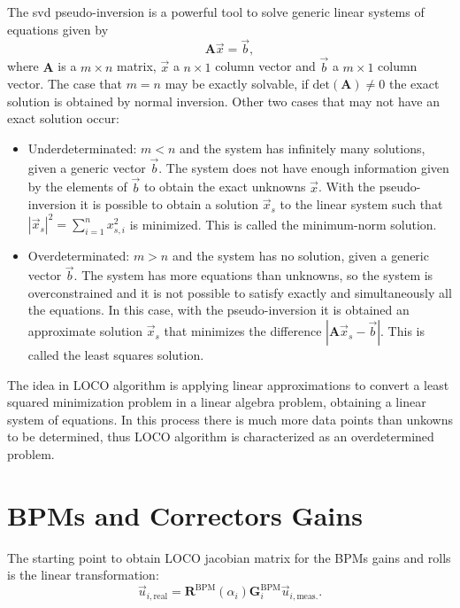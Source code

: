 The \gls{svd} pseudo-inversion is a powerful tool to solve generic linear systems of equations given by
\begin{equation}
    \mathbf{A} \vec{x} = \vec{b},
    \label{eq:linear_system}
\end{equation}
where $\mathbf{A}$ is a $m \times n$ matrix, $\vec{x}$ a $n \times 1$ column vector and $\vec{b}$ a $m \times 1$ column vector. The case that $m=n$ may be exactly solvable, if $\mathrm{det}\left(\mathbf{A}\right) \neq 0$ the exact solution is obtained by normal inversion. Other two cases that may not have an exact solution occur:
\begin{itemize}
    \item Underdeterminated: $m < n$ and the system has infinitely many solutions, given a generic vector $\vec{b}$. The system does not have enough information given by the elements of $\vec{b}$ to obtain the exact unknowns $\vec{x}$. With the pseudo-inversion it is possible to obtain a solution $\vec{x}_s$ to the linear system such that $|\vec{x}_s|^2 = \sum_{i=1}^{n}x^2_{s, i}$ is minimized. This is called the minimum-norm solution.
    \item Overdeterminated: $m > n$ and the system has no solution, given a generic vector $\vec{b}$. The system has more equations than unknowns, so the system is overconstrained and it is not possible to satisfy exactly and simultaneously all the equations. In this case, with the pseudo-inversion it is obtained an approximate solution $\vec{x}_s$ that minimizes the difference $|\mathbf{A}\vec{x}_s - \vec{b}|$. This is called the least squares solution.
\end{itemize}

The idea in LOCO algorithm is applying linear approximations to convert a least squared minimization problem in a linear algebra problem, obtaining a linear system of equations. In this process there is much more data points than unkowns to be determined, thus LOCO algorithm is characterized as an overdetermined problem.

\chapter{BPMs and Correctors Gains}\label{appendix:gains}

The starting point to obtain LOCO jacobian matrix for the BPMs gains and rolls is the linear transformation:
\begin{equation}
    \vec{u}_{i, \mathrm{real}} = \mathbf{R}^{\mathrm{BPM}}\left(\alpha_i\right) \mathbf{G}_{i}^{\mathrm{BPM}} \vec{u}_{i, \mathrm{meas.}}.
    \label{eq:gain_bpm_app}
\end{equation}

